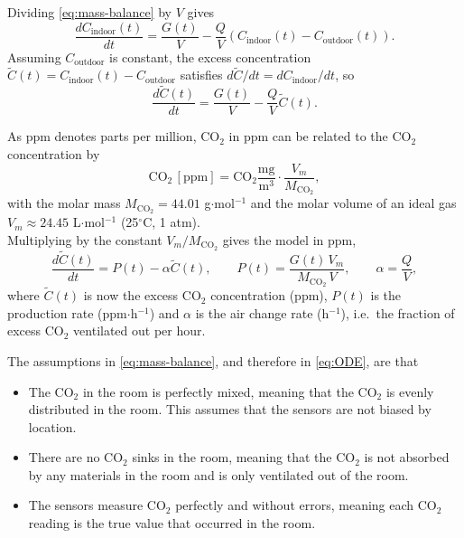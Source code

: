 Dividing \cref{eq:mass-balance} by $V$ gives
\begin{equation}
    \frac{d C_{\text{indoor}}(t)}{dt} = \frac{G(t)}{V} - \frac{Q}{V} \left( C_{\text{indoor}}(t) - C_{\text{outdoor}}(t) \right).
\end{equation}
Assuming $C_{\text{outdoor}}$ is constant, the excess concentration
$\tilde{C}(t) = C_{\text{indoor}}(t) - C_{\text{outdoor}}$ satisfies
$d\tilde{C}/dt = dC_{\text{indoor}}/dt$, so
\begin{equation}
    \frac{d \tilde{C}(t)}{dt} = \frac{G(t)}{V} - \frac{Q}{V} \tilde{C}(t).
\end{equation}

As ppm denotes parts per million, $\text{CO}_2$ in ppm can be related to the $\text{CO}_2$ concentration by 
$$
\text{CO}_2\,[\text{ppm}] = \text{CO}_2 \frac{\text{mg}}{\text{m}^3} \cdot \frac{V_m}{M_{\text{CO}_2}},$$
with the molar mass $M_{\text{CO}_2} = 44.01$ g$\cdot$mol$^{-1}$ and the molar volume of an ideal gas $V_m \approx 24.45$ L$\cdot$mol$^{-1}$
(25$^\circ$C, 1 atm). \\Multiplying by the constant $V_m / M_{\text{CO}_2}$ gives the model in ppm,
\begin{equation}
    \frac{d \tilde{C}(t)}{dt} = P(t) - \alpha \tilde{C}(t),
    \qquad
    P(t) = \frac{G(t)\, V_m}{M_{\text{CO}_2}\, V},
    \qquad
    \alpha = \frac{Q}{V},
    \label{eq:ODE}
\end{equation}
where $\tilde{C}(t)$ is now the excess $\text{CO}_2$ concentration (ppm), $P(t)$ is the
production rate (ppm$\cdot$h$^{-1}$) and $\alpha$ is the air change rate (h$^{-1}$),
i.e.\ the fraction of excess $\text{CO}_2$ ventilated out per hour.
\bigskip

The assumptions in \cref{eq:mass-balance}, and therefore in \cref{eq:ODE}, are that
\begin{itemize}
    \item The $\text{CO}_2$ in the room is perfectly mixed, meaning that the $\text{CO}_2$ is evenly distributed in the room. This assumes that the sensors are not biased by location.
    \item There are no $\text{CO}_2$ sinks in the room, meaning that the $\text{CO}_2$ is not absorbed by any materials in the room and is only ventilated out of the room.
    \item The sensors measure $\text{CO}_2$ perfectly and without errors, meaning each $\text{CO}_2$ reading is the true value that occurred in the room.
\end{itemize}

